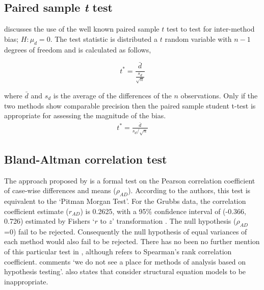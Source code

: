 \documentclass[12pt, a4paper]{report}
\theoremstyle{plain}
\theoremstyle{definition}
\theoremstyle{remark}
\begin{document}
\subsection{Paired sample \emph{t} test}

\citet{Bartko} discusses the use of the well known paired sample
$t$ test to test for inter-method bias; $H: \mu_{d}=0$. The test
statistic is distributed a $t$ random variable with $n-1$ degrees
of freedom and is calculated as follows,

\begin{equation}
t^{*} = \frac{\bar{d}}{ \frac{s_{d}}{\sqrt{n}}}
\end{equation}

where $\bar{d}$ and $s_{d}$ is the average of the differences of
the $n$ observations. Only if the two methods show comparable
precision then the paired sample student t-test is appropriate for
assessing the magnitude of the bias.
\begin{eqnarray}
t^{*} = \frac{\bar{d}}{s_{d}/\sqrt{n}}
\end{eqnarray}

\subsection{Bland-Altman correlation test}

The approach proposed by \citet{BA83} is a formal test on the
Pearson correlation coefficient of case-wise differences and means
($\rho_{AD}$). According to the authors, this test is equivalent
to the `Pitman Morgan Test'. For the Grubbs data, the correlation
coefficient estimate ($r_{AD}$) is 0.2625, with a 95\% confidence
interval of (-0.366, 0.726) estimated by Fishers `$r$ to $z$'
transformation \citep*{Cohen}. The null hypothesis ($\rho_{AD}$ =0)
fail to be rejected. Consequently the null hypothesis of equal
variances of each method would also fail to be rejected. There has
no been no further mention of this particular test in
\citet{BA86}, although \citet{BA99} refers to Spearman's rank
correlation coefficient. \citet{BA99} comments `we do not see a
place for methods of analysis based on hypothesis testing'.
\citet{BA99} also states that consider structural equation models
to be inappropriate.
\end{document}
